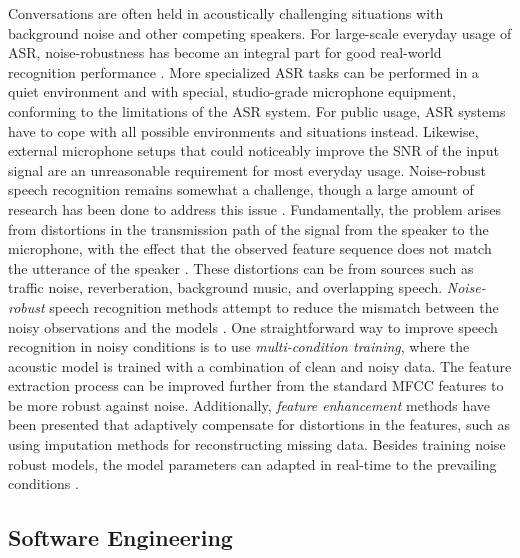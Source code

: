\documentclass[english, 12pt, a4paper, pdftex, elec, utf8]{aaltothesis}
\begin{document}
Conversations are often held in acoustically challenging situations with background noise and other competing speakers. For large-scale everyday usage of ASR, noise-robustness has become an integral part for good real-world recognition performance \cite{li2014overview}. More specialized ASR tasks can be performed in a quiet environment and with special, studio-grade microphone equipment, conforming to the limitations of the ASR system. For public usage, ASR systems have to cope with all possible environments and situations instead. Likewise, external microphone setups that could noticeably improve the SNR of the input signal are an unreasonable requirement for most everyday usage. Noise-robust speech recognition remains somewhat a challenge, though a large amount of research has been done to address this issue \cite{keronen2014approaching, li2014overview, kallasjoki2016, keronen2010comparison, qian2016very}. Fundamentally, the problem arises from distortions in the transmission path of the signal from the speaker to the microphone, with the effect that the observed feature sequence does not match the utterance of the speaker \cite{li2014overview, kallasjoki2016}. These distortions can be from sources such as traffic noise, reverberation, background music, and overlapping speech. \textit{Noise-robust} speech recognition methods attempt to reduce the mismatch between the noisy observations and the models \cite{li2014overview, kallasjoki2016, keronen2010comparison}. One straightforward way to improve speech recognition in noisy conditions is to use \textit{multi-condition training}, where the acoustic model is trained with a combination of clean and noisy data. The feature extraction process can be improved further from the standard MFCC features to be more robust against noise. Additionally, \textit{feature enhancement} methods have been presented that adaptively compensate for distortions in the features, such as using imputation methods for reconstructing missing data. Besides training noise robust models, the model parameters can adapted in real-time to the prevailing conditions \cite{kallasjoki2016}.

\subsection{Software Engineering} \label{subsec:soft}
\end{document}
